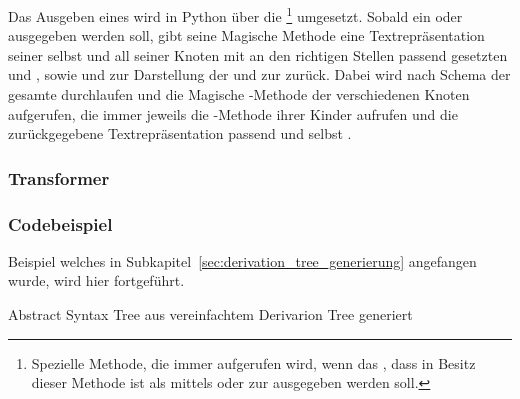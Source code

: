 Das Ausgeben eines  wird in Python über die  \footnote{Spezielle Methode, die immer aufgerufen wird, wenn das , dass in Besitz dieser Methode ist als  mittels  oder zur  ausgegeben werden soll.} umgesetzt. Sobald ein  oder  ausgegeben werden soll, gibt seine Magische Methode  eine Textrepräsentation seiner selbst und all seiner Knoten mit an den richtigen Stellen passend gesetzten   \smalltt{(} und  \smalltt{)} , sowie  \smalltt{,} und  \smalltt{;} zur Darstellung der  und zur  zurück. Dabei wird nach  Schema der gesamte  durchlaufen und die Magische -Methode der verschiedenen Knoten aufgerufen, die immer jeweils die -Methode ihrer Kinder aufrufen und die zurückgegebene Textrepräsentation passend  und selbst .


\subsubsection{Transformer}

\subsubsection{Codebeispiel}
Beispiel welches in Subkapitel~\ref{sec:derivation_tree_generierung} angefangen wurde, wird hier fortgeführt.

\begin{code}
  \centering
  \caption{Abstract Syntax Tree aus vereinfachtem Derivarion Tree generiert}
  \label{code:abstract_syntax_tree_aus_vereinfachtem_derivarion_tree_generiert}
\end{code}

